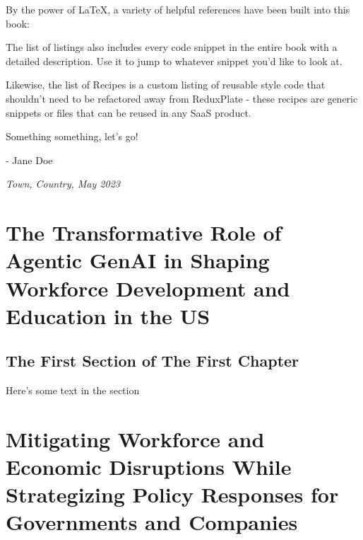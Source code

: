 \documentclass[a4paper,headinclude=on,footinclude=on,12pt,oneside]{scrbook}
\begin{document}

By the power of LaTeX, a variety of helpful references have been built into this book:



The list of listings also includes every code snippet in the entire book with a detailed description. Use it to jump to whatever snippet you'd like to look at.

Likewise, the list of Recipes is a custom listing of reusable style code that shouldn't need to be refactored away from ReduxPlate - these recipes are generic snippets or files that can be reused in any SaaS product.


Something something, let's go!

- Jane Doe

\textit{Town, Country, May 2023}

\chapter{The Transformative Role of Agentic GenAI in Shaping Workforce Development and Education in the US}

\section{The First Section of The First Chapter}

Here's some text in the section

\chapter{Mitigating Workforce and Economic Disruptions While Strategizing Policy Responses for Governments and Companies}
\end{document}
